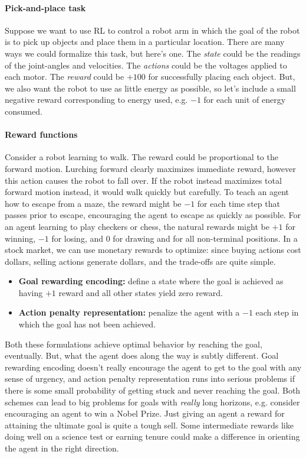 \documentclass[12pt]{article}
\begin{document}
\paragraph{Pick-and-place task} Suppose we want to use RL to control a robot arm in which the goal of the robot is to pick up objects and place them in a particular location. There are many ways we could formalize this task, but here's one. The \emph{state} could be the readings of the joint-angles and velocities. The \emph{actions} could be the voltages applied to each motor. The \emph{reward} could be $+100$ for successfully placing each object. But, we also want the robot to use as little energy as possible, so let's include a small negative reward corresponding to energy used, e.g. $-1$ for each unit of energy consumed.

\paragraph{Reward functions} Consider a robot learning to walk. The reward could be proportional to the forward motion. Lurching forward clearly maximizes immediate reward, however this action causes the robot to fall over. If the robot instead maximizes total forward motion instead, it would walk quickly but carefully. To teach an agent how to escape from a maze, the reward might be $-1$ for each time step that passes prior to escape, encouraging the agent to escape as quickly as possible. For an agent learning to play checkers or chess, the natural rewards might be $+1$ for winning, $-1$ for losing, and $0$ for drawing and for all non-terminal positions. In a stock market, we can use monetary rewards to optimize: since buying actions cost dollars, selling actions generate dollars, and the trade-offs are quite simple.
\begin{itemize}
\item \textbf{Goal rewarding encoding:} define a state where the goal is achieved as   having $+1$ reward and all other states yield zero reward.
\item \textbf{Action penalty representation:} penalize the agent with a $-1$ each step in which the goal has not been achieved.
\end{itemize}
Both these formulations achieve optimal behavior by reaching the goal, eventually. But, what the agent does along the way is subtly different. Goal rewarding encoding doesn't really encourage the agent to get to the goal with any sense of urgency, and action penalty representation runs into serious problems if there is some small probability of getting stuck and never reaching the goal. Both schemes can lead to big problems for goals with \emph{really} long horizons, e.g. consider encouraging an agent to win a Nobel Prize. Just giving an agent a reward for attaining the ultimate goal is quite a tough sell. Some intermediate rewards like doing well on a science test or earning tenure could make a difference in orienting the agent in the right direction.
\end{document}
